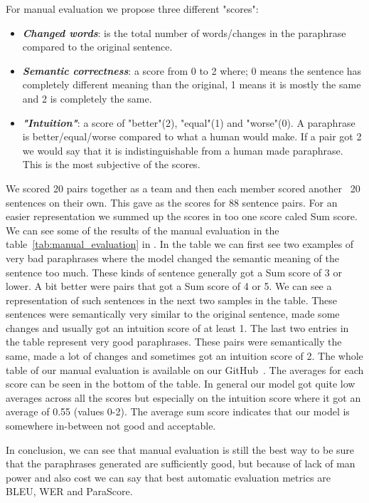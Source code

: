 \documentclass[fleqn,moreauthors,10pt]{ds_report}
\begin{document}
For manual evaluation we propose three different "scores": 
\begin{itemize}
    \item \textit{\textbf{Changed words}}: is the total number of words/changes in the paraphrase compared to the original sentence.
    \item \textit{\textbf{Semantic correctness}}: a score from 0 to 2 where; 0 means the sentence has completely different meaning than the original, 1 means it is mostly the same and 2 is completely the same. 
    \item \textit{\textbf{"Intuition"}}: a score of "better"(2), "equal"(1) and "worse"(0). A paraphrase is  better/equal/worse compared to what a human would make. If a pair got 2 we would say that it is indistinguishable from a human made paraphrase. This is the most subjective of the scores.
\end{itemize}

We scored 20 pairs together as a team and then each member scored another ~20 sentences on their own. This gave as the scores for 88 sentence pairs. For an easier representation we summed up the scores in too one score caled Sum score. \\

We can see some of the results of the manual evaluation in the table~\ref{tab:manual_evaluation} in . In the table we can first see two examples of very bad paraphrases where the model changed the semantic meaning of the sentence too much. These kinds of sentence generally got a Sum score of 3 or lower. A bit better were pairs that got a Sum score of 4 or 5. We can see a representation of such sentences in the next two samples in the table. These sentences were semantically very similar to the original sentence, made some changes and usually got an intuition score of at least 1. The last two entries in the table represent very good paraphrases. These pairs were semantically the same, made a lot of changes and sometimes got an intuition score of 2. The whole table of our manual evaluation is available on our GitHub~\cite{GitHub}. The averages for each score can be seen in the bottom of the table. In general our model got quite low averages across all the scores but especially on the intuition score where it got an average of 0.55 (values 0-2). The average sum score indicates that our model is somewhere in-between not good and acceptable.

In conclusion, we can see that manual evaluation is still the best way to be sure that the paraphrases generated are sufficiently good, but because of lack of man power and also cost we can say that best automatic evaluation metrics are BLEU, WER and ParaScore.
\end{document}
